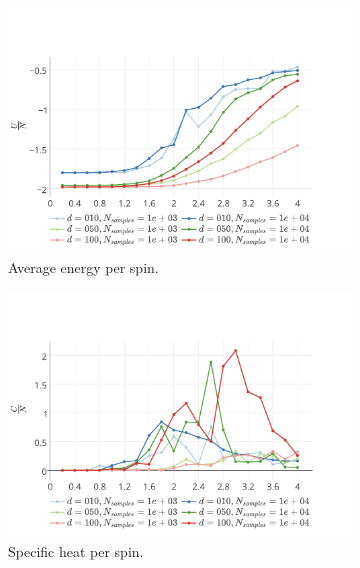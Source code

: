 	\begin{figure}
		\centering
		\begin{subfigure}{\columnwidth}
			\centering
			\includegraphics[width=\textwidth]{./img/2D/averageEnergy}
			\caption{Average energy per spin.}
			\label{fig:results:2D:averageEnergy}
		\end{subfigure}
		\begin{subfigure}{\columnwidth}
			\centering
			\includegraphics[width=\textwidth]{./img/2D/specificHeat}
			\caption{Specific heat per spin.}
			\label{fig:results:2D:specificHeat}
		\end{subfigure}	
		\begin{subfigure}{\columnwidth}
			\centering

\end{subfigure}
\end{figure}
